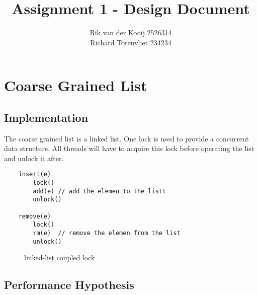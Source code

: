 \documentclass[10pt,a4paper]{article}
\author{Rik van der Kooij 2526314\\Richard Torenvliet 234234}
\title{Assignment 1 - Design Document}
\begin{document}
\maketitle



\section{Coarse Grained List}
\subsection{Implementation}
    The coarse grained list is a linked list. One lock is used to provide a concurrent data structure. All threads will have to acquire this lock before operating the list and unlock it after. 
   
\begin{lstlisting}
    insert(e) 
        lock()
        add(e) // add the elemen to the listt
        unlock()

    remove(e)
        lock()
        rm(e)  // remove the elemen from the list
        unlock()
\end{lstlisting}

\begin{figure}[!h]
\centerline{
}
\caption{linked-list coupled lock}
\end{figure}
    
\subsection{Performance Hypothesis}
\end{document}
